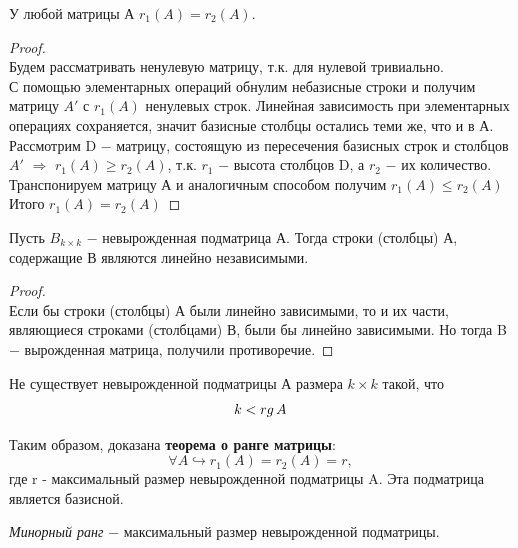 \begin{theorem}
    У любой матрицы А $r_1(A) = r_2(A)$.
\end{theorem}
\begin{proof}
    \tab\\

    Будем рассматривать ненулевую матрицу, т.к. для нулевой тривиально.\\

    С помощью элементарных операций обнулим небазисные строки и получим матрицу $A'$ с $r_1(A)$ ненулевых строк. Линейная зависимость при элементарных операциях сохраняется, значит базисные столбцы остались теми же, что и в А.\\

    Рассмотрим D $-$ матрицу, состоящую из пересечения базисных строк и столбцов $A'$ $\Longrightarrow$ $r_1(A) \geq r_2(A)$, т.к. $r_1$ $-$ высота столбцов D, а $r_2$ $-$ их количество.\\

    Транспонируем матрицу А и аналогичным способом получим $r_1(A) \leq r_2(A)$\\

    Итого $r_1(A) = r_2(A)$
\end{proof}

\begin{proposition}
    Пусть $B_{k\times k}$ $-$ невырожденная подматрица А. Тогда строки (столбцы) А, содержащие В являются линейно независимыми.
\end{proposition}
\begin{proof}
    \tab\\

    Если бы строки (столбцы) А были линейно зависимыми, то и их части, являющиеся строками (столбцами) В, были бы линейно зависимыми. Но тогда B $-$ вырожденная матрица, получили противоречие.
\end{proof}

\begin{corollary}
    Не существует невырожденной подматрицы А размера $k\times k$ такой, что
    \[
    k < rg\thinspace A
    \]
\end{corollary}

Таким образом, доказана \textbf{теорема о ранге матрицы}:
\[
\forall A \hookrightarrow r_1(A) = r_2(A) = r,
\]
где r - максимальный размер невырожденной подматрицы A. Эта подматрица является базисной.

\begin{definition}
    \textit{Минорный ранг} $-$ максимальный размер невырожденной подматрицы.
\end{definition}









